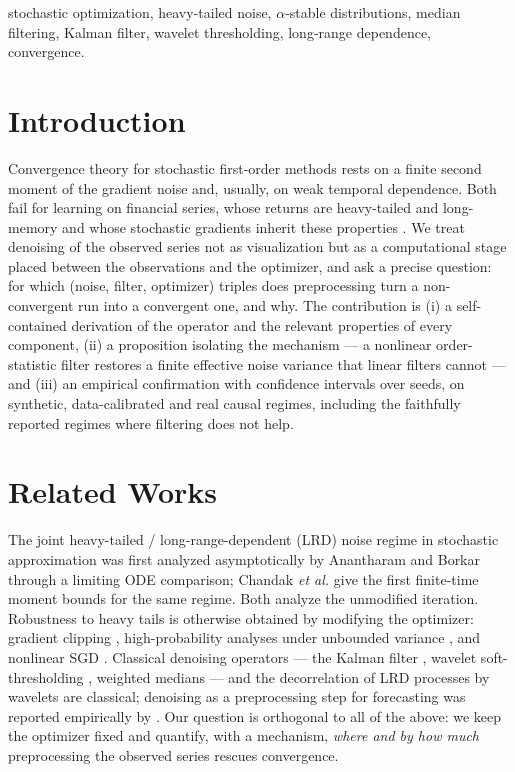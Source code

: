 \documentclass[conference]{IEEEtran}
\begin{document}
\begin{IEEEkeywords}
stochastic optimization, heavy-tailed noise, $\alpha$-stable
distributions, median filtering, Kalman filter, wavelet thresholding,
long-range dependence, convergence.
\end{IEEEkeywords}

\section{Introduction}

Convergence theory for stochastic first-order methods rests on a
finite second moment of the gradient noise and, usually, on weak
temporal dependence. Both fail for learning on financial series, whose
returns are heavy-tailed and long-memory \cite{cont2001,mandelbrot1963}
and whose stochastic gradients inherit these properties
\cite{simsekli2019tailindex}. We treat denoising of the observed series
not as visualization but as a computational stage placed between the
observations and the optimizer, and ask a precise question: for which
(noise, filter, optimizer) triples does preprocessing turn a
non-convergent run into a convergent one, and why. The contribution is
(i) a self-contained derivation of the operator and the relevant
properties of every component, (ii) a proposition isolating the
mechanism --- a nonlinear order-statistic filter restores a finite
effective noise variance that linear filters cannot --- and (iii) an
empirical confirmation with confidence intervals over seeds, on
synthetic, data-calibrated and real causal regimes, including the
faithfully reported regimes where filtering does not help.

\section{Related Works}

The joint heavy-tailed / long-range-dependent (LRD) noise regime in
stochastic approximation was first analyzed asymptotically by
Anantharam and Borkar \cite{anantharam2012sa} through a limiting ODE
comparison; Chandak \emph{et al.} \cite{chandak2026hl} give the first
finite-time moment bounds for the same regime. Both analyze the
unmodified iteration. Robustness to heavy tails is otherwise obtained
by modifying the optimizer: gradient clipping
\cite{gorbunov2020clipping}, high-probability analyses under unbounded
variance \cite{cutkosky2021high,sadiev2023highprob}, and nonlinear SGD
\cite{armacki2024nonlinear}. Classical denoising operators ---
the Kalman filter \cite{kalman1960}, wavelet soft-thresholding
\cite{donoho1994wavelets,donoho1995noising,mallat1999wavelet}, weighted
medians \cite{yin1996median} --- and the decorrelation of LRD processes
by wavelets \cite{percival2000wavelet} are classical; denoising as a
preprocessing step for forecasting was reported empirically by
\cite{tang2021denoising}. Our question is orthogonal to all of the
above: we keep the optimizer fixed and quantify, with a mechanism,
\emph{where and by how much} preprocessing the observed series rescues
convergence.
\end{document}
